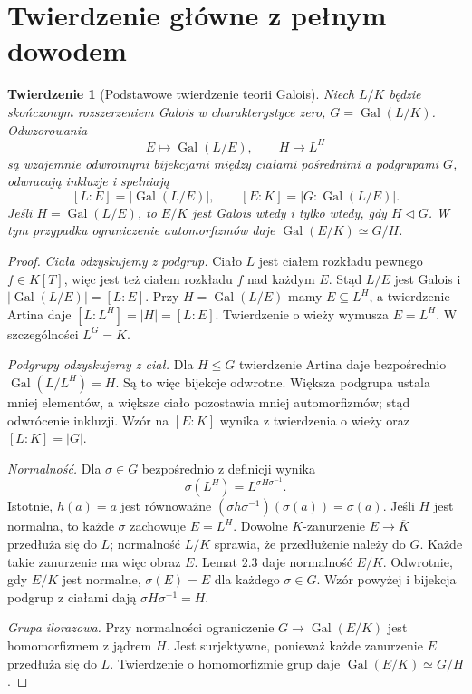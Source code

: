 \documentclass[11pt,a4paper,oneside]{book}
\numberwithin{equation}{section}
\theoremstyle{plain}
\newtheorem{twierdzenie}{Twierdzenie}[chapter]
\theoremstyle{definition}
\theoremstyle{remark}
\newcommand{\Gal}{\operatorname{Gal}}
\begin{document}
\section{Twierdzenie główne z pełnym dowodem}

\begin{twierdzenie}[Podstawowe twierdzenie teorii Galois]
Niech $L/K$ będzie skończonym rozszerzeniem Galois w charakterystyce zero, $G=\Gal(L/K)$. Odwzorowania
\[
E\longmapsto\Gal(L/E),\qquad H\longmapsto L^H
\]
są wzajemnie odwrotnymi bijekcjami między ciałami pośrednimi a podgrupami $G$, odwracają inkluzje i spełniają
\[
[L:E]=|\Gal(L/E)|,\qquad [E:K]=|G:\Gal(L/E)|.
\]
Jeśli $H=\Gal(L/E)$, to $E/K$ jest Galois wtedy i tylko wtedy, gdy $H\triangleleft G$. W tym przypadku ograniczenie automorfizmów daje $\Gal(E/K)\simeq G/H$.
\end{twierdzenie}
\begin{proof}
\emph{Ciała odzyskujemy z podgrup.} Ciało $L$ jest ciałem rozkładu pewnego $f\in K[T]$, więc jest też ciałem rozkładu $f$ nad każdym $E$. Stąd $L/E$ jest Galois i $|\Gal(L/E)|=[L:E]$. Przy $H=\Gal(L/E)$ mamy $E\subseteq L^H$, a twierdzenie Artina daje $[L:L^H]=|H|=[L:E]$. Twierdzenie o wieży wymusza $E=L^H$. W szczególności $L^G=K$.

\emph{Podgrupy odzyskujemy z ciał.} Dla $H\le G$ twierdzenie Artina daje bezpośrednio $\Gal(L/L^H)=H$. Są to więc bijekcje odwrotne. Większa podgrupa ustala mniej elementów, a większe ciało pozostawia mniej automorfizmów; stąd odwrócenie inkluzji. Wzór na $[E:K]$ wynika z twierdzenia o wieży oraz $[L:K]=|G|$.

\emph{Normalność.} Dla $\sigma\in G$ bezpośrednio z definicji wynika
\[
\sigma(L^H)=L^{\sigma H\sigma^{-1}}.
\]
Istotnie, $h(a)=a$ jest równoważne $(\sigma h\sigma^{-1})(\sigma(a))=\sigma(a)$. Jeśli $H$ jest normalna, to każde $\sigma$ zachowuje $E=L^H$. Dowolne $K$-zanurzenie $E\to\overline K$ przedłuża się do $L$; normalność $L/K$ sprawia, że przedłużenie należy do $G$. Każde takie zanurzenie ma więc obraz $E$. Lemat 2.3 daje normalność $E/K$. Odwrotnie, gdy $E/K$ jest normalne, $\sigma(E)=E$ dla każdego $\sigma\in G$. Wzór powyżej i bijekcja podgrup z ciałami dają $\sigma H\sigma^{-1}=H$.

\emph{Grupa ilorazowa.} Przy normalności ograniczenie $G\to\Gal(E/K)$ jest homomorfizmem z jądrem $H$. Jest surjektywne, ponieważ każde zanurzenie $E$ przedłuża się do $L$. Twierdzenie o homomorfizmie grup daje $\Gal(E/K)\simeq G/H$.
\end{proof}
\end{document}
